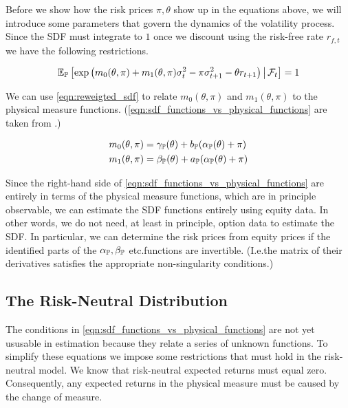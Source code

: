 \documentclass[11pt, letterpaper, twoside, final]{article}
\begin{document}
Before we show how the risk prices $\pi, \theta$ show up in the equations above, we will introduce some parameters
that govern the dynamics of the volatility process.
Since the SDF must integrate to $1$ once we discount using the risk-free rate $r_{f,t}$\, we have the following
restrictions.


\begin{equation}
    \label{eqn:reweigted_sdf}
    \operatorname{\mathbb{E}}_{\mathbb{P}}\left[\exp\left(m_0(\theta, \pi) + m_1(\theta, \pi) \sigma^2_t - \pi \sigma^2_{t+1} - \theta r_{t+1}
    \right) \,\middle\vert\, \mathcal{F}_t \right] = 1 \\
\end{equation}


We can use \cref{eqn:reweigted_sdf} to relate $m_0(\theta, \pi)$ and $m_1(\theta, \pi)$ to the physical measure
functions. 
(\cref{eqn:sdf_functions_vs_physical_functions} are taken from \textcite[3.4]{khrapov2016affine}.)

\begin{align}
    \label{eqn:sdf_functions_vs_physical_functions}
    m_0(\theta, \pi)  &= \gamma_{\mathbb{P}}(\theta) + b_{\mathbb{P}}(\alpha_{\mathbb{P}}(\theta) + \pi) \\
    m_1(\theta, \pi)  &= \beta_{\mathbb{P}}(\theta) + a_{\mathbb{P}}(\alpha_{\mathbb{P}}(\theta) + \pi) \nonumber
\end{align}

Since the right-hand side of \cref{eqn:sdf_functions_vs_physical_functions} are entirely in terms of the physical
measure functions, which are in principle observable, we can estimate the SDF functions entirely using equity
data.
In other words, we do not need, at least in principle, option data to estimate the SDF.
In particular, we can determine the risk prices from equity prices if the identified parts of the $\alpha_{\mathbb{P}},
\beta_{\mathbb{P}}$ etc.\@ functions are  invertible.
(I.e.\@ the matrix of their derivatives satisfies the appropriate non-singularity conditions.)

\subsection{The Risk-Neutral Distribution}

The conditions in \cref{eqn:sdf_functions_vs_physical_functions} are not yet ususable in estimation because they
relate a series of unknown functions.
To simplify these equations we impose some restrictions that must hold in the risk-neutral model. 
We know that risk-neutral expected returns must equal zero.
Consequently, any expected returns in the physical measure must be caused by the change of measure.
\end{document}
